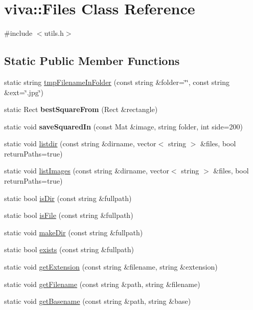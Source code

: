 \hypertarget{classviva_1_1_files}{}\section{viva\+:\+:Files Class Reference}
\label{classviva_1_1_files}


{\ttfamily \#include $<$utils.\+h$>$}

\subsection*{Static Public Member Functions}
\begin{DoxyCompactItemize}
\item 
static string \hyperlink{classviva_1_1_files_a17a0412cc8285a459d0a335bf8835e7f}{tmp\+Filename\+In\+Folder} (const string \&folder=\char`\"{}\char`\"{}, const string \&ext=\char`\"{}.jpg\char`\"{})
\item 
static Rect {\bfseries best\+Square\+From} (Rect \&rectangle)\hypertarget{classviva_1_1_files_aa0d277292b290426118012ffc7e4e0b7}{}\label{classviva_1_1_files_aa0d277292b290426118012ffc7e4e0b7}

\item 
static void {\bfseries save\+Squared\+In} (const Mat \&image, string folder, int side=200)\hypertarget{classviva_1_1_files_a9006758a50b0a9f92a275bf83d2ecc66}{}\label{classviva_1_1_files_a9006758a50b0a9f92a275bf83d2ecc66}

\item 
static void \hyperlink{classviva_1_1_files_a0f1b353d1cad3b64bdcd617a2e0bb356}{listdir} (const string \&dirname, vector$<$ string $>$ \&files, bool return\+Paths=true)
\item 
static void \hyperlink{classviva_1_1_files_a6a1c923fc2fa5ab958ae48d79944cf1d}{list\+Images} (const string \&dirname, vector$<$ string $>$ \&files, bool return\+Paths=true)
\item 
static bool \hyperlink{classviva_1_1_files_ac7835989bfb2b74fb864199362a92e72}{is\+Dir} (const string \&fullpath)
\item 
static bool \hyperlink{classviva_1_1_files_a38538c759fe494f86ac6a310c5409b1a}{is\+File} (const string \&fullpath)
\item 
static void \hyperlink{classviva_1_1_files_a6ffb9c2564fafe3bea2217f0fbccd2d5}{make\+Dir} (const string \&fullpath)
\item 
static bool \hyperlink{classviva_1_1_files_aa65c5d0667235976621e6d51969cdd47}{exists} (const string \&fullpath)
\item 
static void \hyperlink{classviva_1_1_files_ab3c5625f419ae2db28f16c827c53ee42}{get\+Extension} (const string \&filename, string \&extension)
\item 
static void \hyperlink{classviva_1_1_files_abc726ef29d704a2a8c5c75506db76e5b}{get\+Filename} (const string \&path, string \&filename)
\item 
static void \hyperlink{classviva_1_1_files_a0f06aae1db4372c026e5b2d7d7f9647d}{get\+Basename} (const string \&path, string \&base)
\end{DoxyCompactItemize}
